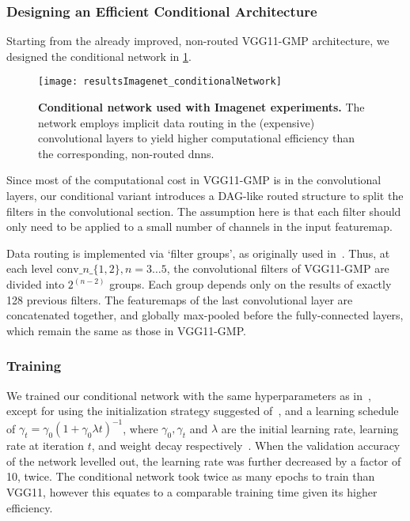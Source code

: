 \documentclass[thesis]{subfiles}
\begin{document}
	\subsubsection{Designing an Efficient Conditional Architecture}
	Starting from the already improved, non-routed VGG11-GMP architecture, we designed the conditional network in \cref{fig:Imagenet_CondNet}.
	\begin{figure}[tbp]
		\centering
		\texttt{[image: resultsImagenet\_conditionalNetwork]}
		\caption[Conditional network used with ILSVRC experiments]{\textbf{Conditional network used with Imagenet experiments.} The network employs implicit data routing in the (expensive) convolutional layers to yield higher computational efficiency than the corresponding, non-routed \glspl{dnn}.}\label{fig:Imagenet_CondNet}
	\end{figure}
	Since most of the computational cost in VGG11-GMP is in the convolutional layers, our conditional variant 
	introduces a DAG-like routed structure to split the filters in the convolutional section.
	The assumption here is that each filter should only need to be applied to a small number of channels in the input \gls{featuremap}.
	
	Data routing is implemented via `filter groups', as originally used in~\citep{Krizhevsky2012}. 
	Thus, at each level $\textrm{conv}\_n\_\{1,2\}, n=3\ldots 5$, the convolutional filters of VGG11-GMP are 
	divided into $2^{(n-2)}$ groups. Each group depends only on the results of exactly 128 previous filters. 
	The \gls{featuremap}s of the last convolutional layer are concatenated together, and globally max-pooled
	before the fully-connected layers, which remain the same as those in VGG11-GMP.
	
	\subsubsection{Training}
	We trained our conditional network with the same hyperparameters as in~\citep{Simonyan2014verydeep}, 
	except for using the initialization strategy suggested of~\citep{He2015b}, and a learning schedule of 
	$\gamma_t = \gamma_0(1+\gamma_0\lambda t)^{-1}$, where $\gamma_0,\gamma_t$ and $\lambda$ 
	are the initial learning rate, learning rate at iteration $t$, and weight decay respectively~\citep{Bottou2012sgdtricks}. 
	When the validation accuracy of the network levelled out, the learning rate was further decreased by a factor of 10, twice. 
	The conditional network took twice as many epochs to train than VGG11, however this equates to a comparable
	training time given its higher efficiency.
\end{document}
